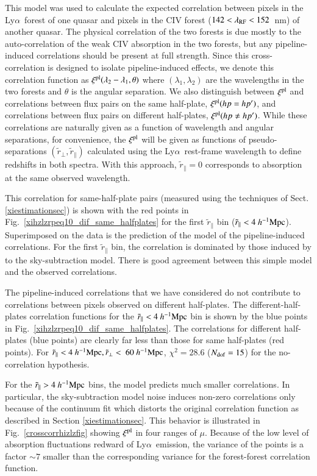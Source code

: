 \documentclass{aa}
\newcommand{\lamrf}{\lambda_{\rm RF}}
\newcommand{\xipl}{\xi^{\rm pl}}
\newcommand{\hMpc}{h^{-1}{\rm Mpc}}
\newcommand{\Lya}{Ly$\alpha$~}
\newcommand{\rperppseudo}{\tilde{r}_\perp}
\newcommand{\rparpseudo}{\tilde{r}_\parallel}
\begin{document}
This model was used to calculate the expected
correlation between pixels in the \Lya forest of one quasar
and pixels in the CIV forest ($142<\lamrf<152$~nm) of another quasar.
The physical correlation of the two forests is due mostly 
to the auto-correlation of the weak  CIV absorption in the two forests,
but any pipeline-induced correlations should be present at full strength.
Since this cross-correlation is designed to isolate pipeline-induced effects,
we denote this 
correlation function as $\xipl(\lambda_2-\lambda_1,\theta)$ where
$(\lambda_1,\lambda_2)$ are the wavelengths in the two
forests and $\theta$ is the angular separation. We also distinguish
between  $\xipl$ and correlations between flux pairs on the same half-plate,
$\xipl({hp=hp^\prime})$, 
and correlations between flux pairs on 
different half-plates,
$\xipl({hp\neq hp^\prime})$.
While these correlations are naturally given as a function of wavelength
and angular separations,
for convenience, the $\xipl$ will be given as functions of pseudo-separations
$(\rperppseudo,\rparpseudo)$ calculated using the \Lya rest-frame
wavelength to define redshifts in both spectra.
With this approach, $\rparpseudo=0$ corresponds to absorption at
the same observed wavelength.



This correlation for same-half-plate pairs (measured using the
techniques of Sect. \ref{xiestimationsec})
is shown with the red points  in Fig.~\ref{xihzlzrpeq10_dif_same_halfplates}
for the first $\rparpseudo$ bin ($\rparpseudo<4~\hMpc$).
Superimposed  on the data is the prediction of the model of
the pipeline-induced correlations.
For the first $\rparpseudo$ bin, the correlation is dominated by
those induced by to the sky-subtraction model.
There is good agreement between this
simple model and the observed correlations.


The pipeline-induced  correlations that we have
considered  do not contribute to correlations
between pixels observed on different half-plates.
The different-half-plates correlation functions
for the $\rparpseudo<4~\hMpc$ bin is shown by the blue points
in Fig.~\ref{xihzlzrpeq10_dif_same_halfplates}.
The correlations for different half-plates (blue points) are clearly
far less than those for same half-plates (red points).
For $\rparpseudo<4~\hMpc,\rperppseudo<~60~\hMpc$, 
$\chi^2=28.6$ ($N_{\rm dof}=15$) for the no-correlation hypothesis. 

For the $\rparpseudo>4~\hMpc$ bins, 
the model predicts much smaller correlations. 
In particular, the sky-subtraction model noise induces non-zero 
correlations only because of the continuum fit which distorts 
the original correlation function as described in 
Section \ref{xiestimationsec}.
This behavior is illustrated in 
Fig.~\ref{crosscorrhizlzfig} showing $\xipl$ in four ranges
of $\mu$.
Because of the low level of absorption fluctuations redward of \Lya emission,
the variance of the points is a factor $\sim7$ smaller
than the corresponding variance for the forest-forest correlation
function. 
\end{document}
